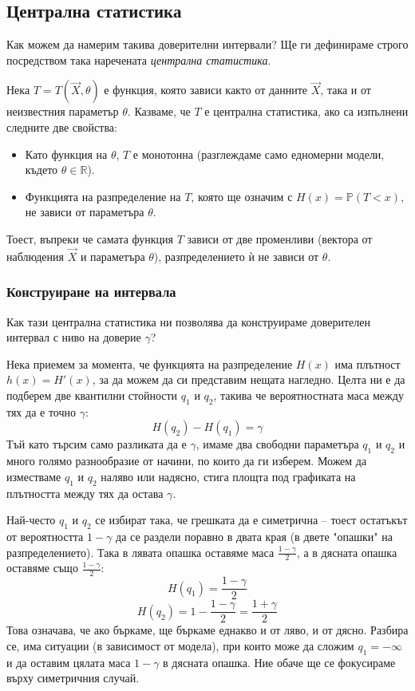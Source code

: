 \documentclass{article}
\begin{document}
\subsection{Централна статистика}
Как можем да намерим такива доверителни интервали? Ще ги дефинираме строго посредством така наречената \textit{централна статистика}.

Нека $T = T(\vec{X}, \theta)$ е функция, която зависи както от данните $\vec{X}$, така и от неизвестния параметър $\theta$. Казваме, че $T$ е централна статистика, ако са изпълнени следните две свойства:
\begin{itemize}
    \item[А)] Като функция на $\theta$, $T$ е монотонна (разглеждаме само едномерни модели, където $\theta \in \mathbb{R}$).
    \item[Б)] Функцията на разпределение на $T$, която ще означим с $H(x) = \mathbb{P}(T < x)$, не зависи от параметъра $\theta$.
\end{itemize}
Тоест, въпреки че самата функция $T$ зависи от две променливи (вектора от наблюдения $\vec{X}$ и параметъра $\theta$), разпределението ѝ не зависи от $\theta$.

\subsubsection{Конструиране на интервала}
Как тази централна статистика ни позволява да конструираме доверителен интервал с ниво на доверие $\gamma$? 

Нека приемем за момента, че функцията на разпределение $H(x)$ има плътност $h(x) = H'(x)$, за да можем да си представим нещата нагледно. Целта ни е да подберем две квантилни стойности $q_1$ и $q_2$, такива че вероятностната маса между тях да е точно $\gamma$:
\[
H(q_2) - H(q_1) = \gamma
\]
Тъй като търсим само разликата да е $\gamma$, имаме два свободни параметъра $q_1$ и $q_2$ и много голямо разнообразие от начини, по които да ги изберем. Можем да изместваме $q_1$ и $q_2$ наляво или надясно, стига площта под графиката на плътността между тях да остава $\gamma$.

Най-често $q_1$ и $q_2$ се избират така, че грешката да е симетрична – тоест остатъкът от вероятността $1 - \gamma$ да се раздели поравно в двата края (в двете "опашки" на разпределението). Така в лявата опашка оставяме маса $\frac{1-\gamma}{2}$, а в дясната опашка оставяме също $\frac{1-\gamma}{2}$:
\[
H(q_1) = \frac{1-\gamma}{2}
\]
\[
H(q_2) = 1 - \frac{1-\gamma}{2} = \frac{1+\gamma}{2}
\]
Това означава, че ако бъркаме, ще бъркаме еднакво и от ляво, и от дясно. Разбира се, има ситуации (в зависимост от модела), при които може да сложим $q_1 = -\infty$ и да оставим цялата маса $1-\gamma$ в дясната опашка. Ние обаче ще се фокусираме върху симетричния случай.
\end{document}
